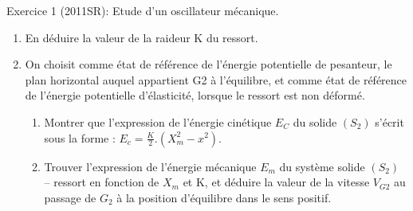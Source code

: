 \documentclass[12pt, french]{article}
\begin{document}
\begin{Box2}{Exercice 1 (2011SR): Etude d’un oscillateur mécanique.}
\begin{enumerate}
\item En déduire la valeur de la raideur K du ressort.
\item On choisit comme état de référence de l’énergie potentielle de pesanteur, le
plan horizontal auquel appartient G2 à l’équilibre, et comme état de
référence de l’énergie potentielle d’élasticité, lorsque le ressort est non
déformé.
\begin{enumerate}
  \item Montrer que l’expression de l’énergie cinétique $E_C$ du solide $(S_2)$
    s’écrit sous la forme : $E_c = \frac{K}{2}.(X_m^2 - x^2)$.
  \item Trouver l’expression de l’énergie mécanique $E_m$ du système
{solide $(S_2)$ – ressort} en fonction de $X_m$ et K, et déduire la valeur de
    la vitesse $V_{G2}$ au passage de $G_2$ à la position d’équilibre dans le sens
positif.
\end{enumerate}
\end{enumerate}


   \end{Box2}
\end{document}
